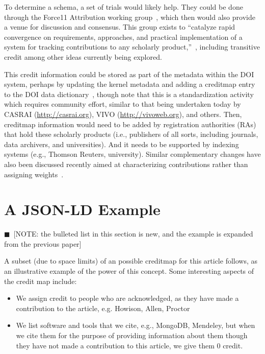 \documentclass[a4paper,10pt]{article}
\newcommand{\note}[1]{{\color{darkgreen}$\blacksquare$~\textsf{[NOTE: #1]}}}
\begin{document}
To determine a schema, a set of trials would likely help.  They could be done through the Force11 Attribution working group~\cite{force11AWG}, which then would also provide a venue for discussion and consensus.  This group exists to ``catalyze rapid convergence on requirements, approaches, and practical implementation of a system for tracking contributions to any scholarly product,''~\cite{force11AWG}, including transitive credit among other ideas currently being explored.

This credit information could be stored as part of the metadata within the DOI system, perhaps by updating the kernel metadata and adding a creditmap entry to the DOI data dictionary~\cite{DOI-data-model}, though note that this is a standardization activity which requires community effort, similar to that being undertaken today by CASRAI (\url{http://casrai.org}), VIVO (\url{http://vivoweb.org}), and others. Then, creditmap information would need to be added by registration authorities (RAs) that hold these scholarly products (i.e., publishers of all sorts, including journals, data archivers, and universities).  And it needs to be supported by indexing systems (e.g., Thomson Reuters, university). Similar complementary changes have also been discussed recently aimed at characterizing contributions rather than assigning  weights~\cite{metatags,contributorship-taxonomy,teams}.


\section{A JSON-LD Example}

\note{the bulleted list in this section is new, and the example is expanded from the previous paper}

A subset (due to space limits) of an possible creditmap for this article follows, as an illustrative example of the power of this concept. Some interesting aspects of the credit map include:
\begin{itemize}
\item We assign credit to people who are acknowledged, as they have made a contribution to the article, e.g. Howison, Allen, Proctor
\item We list software and tools that we cite, e.g., MongoDB, Mendeley, but when we cite them for the purpose of providing information about them though they have not made a contribution to this article, we give them 0 credit.
\end{itemize}
\end{document}
